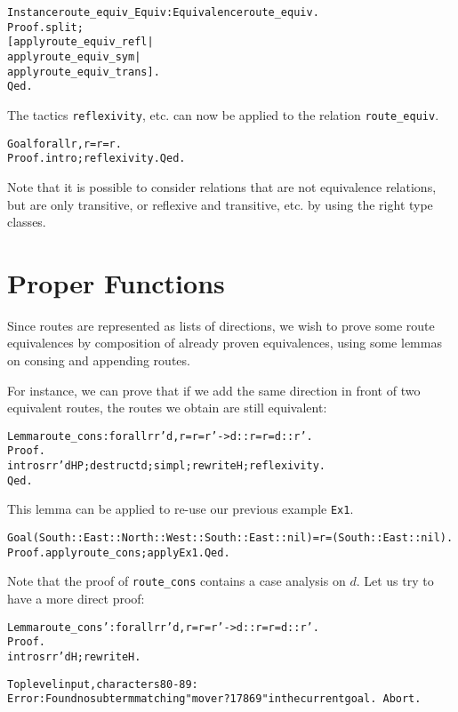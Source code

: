 \documentclass[a4]{report}
\begin{document}
\begin{alltt}
Instance route_equiv_Equiv : Equivalence  route_equiv.
Proof. split;
  [apply route_equiv_refl | 
   apply route_equiv_sym | 
   apply route_equiv_trans].
Qed.
\end{alltt}

The tactics \texttt{reflexivity}, etc.  can now be applied to the 
relation \texttt{route\_equiv}.

\begin{alltt}
Goal forall r, r =r= r.
Proof. intro; reflexivity. Qed.
\end{alltt}

Note that it is possible to consider relations that are not equivalence 
relations, but are only transitive, or reflexive and transitive, etc. by
using the right type classes.

\section{Proper Functions}

Since routes are represented as lists of directions, we wish to prove 
some route equivalences by composition of already proven equivalences,
using some lemmas on consing and appending routes.

For instance, we can prove that if we add the same direction in front of
two equivalent routes, the routes we obtain are still equivalent:

\begin{alltt}
Lemma route_cons : forall r r' d, r =r= r' -> d::r =r= d::r'.
Proof.
 intros r r' d H P;destruct d;simpl;rewrite H;reflexivity.
Qed.
\end{alltt}

This lemma can be applied  to re-use our previous example \texttt{Ex1}.

\begin{alltt}
Goal (South::East::North::West::South::East::nil) =r= (South::East::nil).
Proof. apply route_cons;apply Ex1. Qed.
\end{alltt}

Note that the proof of \texttt{route\_cons} contains a case analysis on $d$. Let us try to have a more
direct proof:

\begin{alltt}
Lemma route_cons' : forall r r' d, r =r= r' -> d::r =r= d::r'.
Proof.
  intros r r' d H;rewrite H.\it\color{red}

Toplevel input, characters 80-89:
Error: Found no subterm matching "move r ?17869" in the current goal. \tt\color{black}
Abort. 
\end{alltt}
\end{document}
